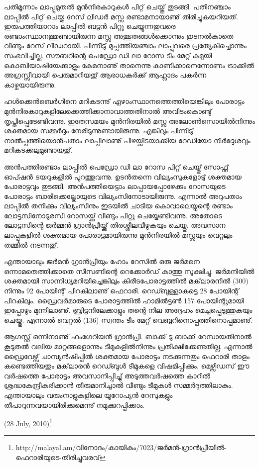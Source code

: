 പതിമൂന്നാം ലാപ്പുമുതല്‍ മുന്‍നിരകാറുകള്‍ പിറ്റ് ചെയ്തു് തുടങ്ങി. പതിനഞ്ചാം ലാപ്പില്‍ പിറ്റ് ചെയ്ത റേസ് ലീഡര്‍ മസ്സ 
രണ്ടാമനായാണു് തിരിച്ചുകയറിയത്. ഇരുപത്തിയാറാം ലാപ്പില്‍ ബട്ടന്‍ പിറ്റു ചെയ്യുന്നതുവരെ രണ്ടാംസ്ഥാനത്തുണ്ടായിരുന്ന 
മസ്സ അത്ഭുതങ്ങള്‍ക്കൊന്നും ഇടനല്‍കാതെ വീണ്ടും റേസ് ലീഡറായി. പിന്നീടു് മുപ്പത്തിയഞ്ചാം 
ലാപ്പുവരെ പ്രത്യേകിച്ചൊന്നും സംഭവിച്ചില്ല. സൗബറിന്റെ പെഡ്രോ ഡി ലാ റോസ ടീം മേറ്റ് കമുയി 
കൊബിയാഷിയേക്കാളും കേമനാണു് താനെന്നു കാണിക്കാനെന്നോണം ട്രാക്കില്‍ അഗ്രസ്സീവായി പെരുമാറിയതു് 
ആരാധകര്‍ക്ക് ആഹ്ലാദം പകര്‍ന്ന കാഴ്ചയായിരുന്നു.

ഹള്‍ക്കെന്‍ബെര്‍ഗിനെ മറികടന്നു് ഏഴാംസ്ഥാനത്തെത്തിയെങ്കിലും പോരാട്ടം 
മുന്‍നിരകാറുകളിലേക്കെത്തിക്കാനാവാത്തതിനാല്‍ അവിടംകൊണ്ടു് തൃപ്തിപ്പെടേണ്ടിവന്നു. ഇതേസമയം മുന്‍നിരയില്‍ 
മസ്സ അലോണ്‍സൊയില്‍നിന്നും ശക്തമായ സമ്മര്‍ദ്ദം നേരിടുന്നുണ്ടായിരുന്നു. എങ്കിലും പിന്നിടു് നാല്‍പ്പത്തിയൊന്‍പതാം 
ലാപ്പിലാണു് പിഴയ്ക്കിടയാക്കിയ റേഡിയോ നിര്‍ദ്ദേശവും മറികടക്കലുമുണ്ടായതു്.

അന്‍പത്തിരണ്ടാം ലാപ്പില്‍ പെഡ്രോ ഡി ലാ റോസ പിറ്റ് ചെയ്തു് സോഫ്റ്റ് ഓപ്ഷന്‍ ടയറുകളില്‍ പുറത്തുവന്നു. ഉടന്‍തന്നെ 
വില്യംസുകളോടു് ശക്തമായ പോരാട്ടവും തുടങ്ങി. അന്‍പത്തിയെട്ടാം ലാപ്പായപ്പോഴേക്കും റോസയുടെ പോരാട്ടം 
ബാരിക്കെല്ലോയുടെ വില്യംസിനോടായിരുന്നു. എന്നാല്‍ അറുപതാം ലാപ്പില്‍ തനിക്കും വില്യംസിനും ഇടയില്‍ ചാടിയ 
കൊവാലെയ്നന്റെ രണ്ടാം ലോട്ടസിനോടുരസി റോസയ്ക്കു് വീണ്ടും പിറ്റു ചെയ്യേണ്ടിവന്നു. അതോടെ ലോട്ടസിന്റെ ജര്‍മ്മന്‍ 
ഗ്രാന്‍പ്രീയ്ക്ക് തിരശ്ശീലവീഴുകയും ചെയ്തു. അവസാന ലാപ്പുകളില്‍ ശക്തമായ പോരാട്ടമായിരുന്നു മുന്‍നിരയില്‍ മസ്സയും 
വെറ്റലും തമ്മില്‍ നടന്നതു്.

എന്തായാലും ജര്‍മന്‍ ഗ്രാന്‍പ്രീയും ഹോം റേസില്‍ ഒരു ജര്‍മനെ ഒന്നാമതെത്തിക്കാതെ സീസണിന്റെ റെക്കോര്‍ഡ് കാത്തു 
സൂക്ഷിച്ചു. ജര്‍മനിയില്‍ ശക്തമായി സാന്നിധ്യമറിയിച്ചെങ്കിലും കിരീടപോരാട്ടത്തില്‍ മക്‌ലാരനില്‍ (300) നിന്നും 92 
പോയിന്റ് പിറകിലാണു് ഫെറാരി. റെഡ്ബുള്ളാകട്ടെ 28 പോയിന്റ് പിറകിലും. ഡ്രൈവര്‍മാരുടെ പോരാട്ടത്തില്‍ 
ഹാമില്‍ട്ടണ്‍ 157 പോയിന്റുമായി ഇപ്പോഴും മുന്നിലാണു്. ബ്രിട്ടനിലേക്കാളും തന്റെ നില അദ്ദേഹം മെച്ചപ്പെടുത്തുകയും 
ചെയ്തു. എന്നാല്‍ വെറ്റല്‍ (136) സ്വന്തം ടീം മേറ്റ് വെബ്ബറിനൊപ്പത്തിനൊപ്പമാണു്.

ആഗസ്റ്റ് ഒന്നിനാണു് ഹംഗേറിയന്‍ ഗ്രാന്‍പ്രീ. ബാക്ക് ടു ബാക്ക് റേസായതിനാല്‍ കൂടുതല്‍ വലിയ മാറ്റങ്ങളൊന്നും 
ടീമുകളില്‍നിന്നും പ്രതീക്ഷിക്കേണ്ടതില്ല. എന്നാല്‍ ഡ്രൈവേഴ്സ് ചാമ്പ്യന്‍ഷിപ്പില്‍ ശക്തമായ പോരാട്ടം നടക്കുന്നതും ഫെറാരി 
താളം കണ്ടെത്തിയതും മക്‌ലാരന്‍ റെഡ്ബുള്‍ ടീമുകളെ വിഷമിപ്പിക്കും. മെഴ്സിഡസ് ഈ വര്‍ഷത്തെ പോരാട്ടം 
അവസാനിപ്പിച്ചു് അടുത്തവര്‍ഷത്തെ കാറില്‍ ശ്രദ്ധകേന്ദ്രീകരിക്കാന്‍ തീരുമാനിച്ചാല്‍ വീണ്ടും ടീമുകള്‍ സമ്മര്‍ദ്ദത്തിലാകും.
എന്തായാലും വരുംനാളുകളിലെ യൂറോപ്യന്‍ റേസുകളും തീപാറുന്നവയായിരിക്കുമെന്നു് നമുക്കുറപ്പിക്കാം.

\hspace*{2em}(28 July, 2010)\footnote{http://malayal.am/വിനോദം/കായികം/7023/ജര്‍മന്‍-ഗ്രാന്‍പ്രീയില്‍-ഫെറാരിയുടെ-തിരിച്ചുവരവ്}

\newpage

